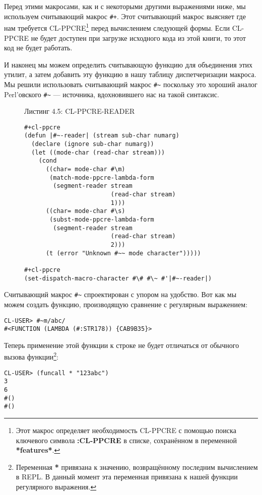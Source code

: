 Перед этими макросами, как и с некоторыми другими выражениями ниже, мы используем считывающий макрос \verb"#+". Этот считывающий макрос выясняет где нам требуется CL-PPCRE\footnote{Этот макрос определяет необходимость CL-PPCRE с помощью поиска ключевого символа \textbf{:CL-PPCRE} в списке, сохранённом в переменной \textbf{*features*}.} перед вычислением следующей формы. Если CL-PPCRE не будет доступен при загрузке исходного кода из этой книги, то этот код не будет работать.

И наконец мы можем определить считывающую функцию для объединения этих утилит, а затем добавить эту функцию в нашу таблицу диспетчеризации макроса. Мы решили использовать считывающий макрос \verb"#~" поскольку это хороший аналог Perl'овского \verb"#~" --- источника, вдохновившего нас на такой синтаксис.

\begin{figure}Листинг 4.5: CL-PPCRE-READER\label{listing_4.5}
\listbegin
\begin{verbatim}
#+cl-ppcre
(defun |#~-reader| (stream sub-char numarg)
  (declare (ignore sub-char numarg))
  (let ((mode-char (read-char stream)))
    (cond
      ((char= mode-char #\m)
       (match-mode-ppcre-lambda-form
        (segment-reader stream
                        (read-char stream)
                        1)))
      ((char= mode-char #\s)
       (subst-mode-ppcre-lambda-form
        (segment-reader stream
                        (read-char stream)
                        2)))
      (t (error "Unknown #~~ mode character")))))

#+cl-ppcre
(set-dispatch-macro-character #\# #\~ #'|#~-reader|)
\end{verbatim}
\listend
\end{figure}

Считывающий макрос \verb"#~" спроектирован с упором на удобство. Вот как мы можем создать функцию, производящую сравнение с регулярным выражением:

\begin{verbatim}
CL-USER> #~m/abc/
#<FUNCTION (LAMBDA (#:STR178)) {CAB9B35}>
\end{verbatim}

Теперь применение этой функции к строке не будет отличаться от обычного вызова функции\footnote{Переменная \textbf{*} привязана к значению, возвращённому последним вычислением в REPL. В данный момент эта переменная привязана к нашей функции регулярного выражения.}:

\begin{verbatim}
CL-USER> (funcall * "123abc")
3
6
#()
#()
\end{verbatim}


